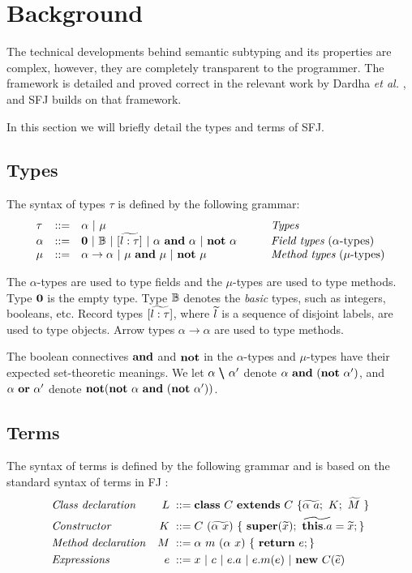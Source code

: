 \section{Background}
\label{sec:background}
The technical developments behind semantic subtyping and its properties are complex, however, they are completely transparent to the programmer. The framework is detailed and proved correct in the relevant work by Dardha \emph{et al.} \cite{Dardha2013,Dardha2017}, and SFJ builds on that framework.

In this section we will briefly detail the types and terms of SFJ.

\subsection{Types}
\label{sec:types}
The syntax of types $\tau$ is defined by the following grammar:
$$
\begin{array}{llll}
\tau & ::= & \alpha \ |\ \mu
& \mbox{{\em Types}}
\\
\alpha & ::=  & \zero \ |\ \btypes \ |\ [\wt{l:\tau}] \ |\ \alpha\ \synwedge\ \alpha \ |\ \synneg\ \alpha
\qquad
& \mbox{{\em Field types} ($\alpha $-types)}
\\
\mu & ::=  & \alpha \to \alpha \ |\ \mu\ \synwedge\ \mu \ |\ \synneg\ \mu
& \mbox{{\em Method types} ($\mu $-types)}
\end{array}
$$

The $\alpha$-types are used to type fields and the $\mu$-types are used to type methods.
Type $\mathbf{0}$ is the empty type.
Type ${\mathbb B}$ denotes the \emph{basic} types, such as integers, booleans, etc.
{Record} types $[\widetilde{l:\tau}]$, where $\widetilde{l}$ is a sequence of disjoint labels, are used to type objects.
Arrow types $\alpha \to \alpha$ are used to type methods.

The boolean connectives $\bf{and}$ and $\bf{not}$ in the $\alpha$-types and $\mu$-types have their expected set-theoretic meanings.
We let $\alpha\ \pmb{\backslash}\ \alpha'$  denote $\alpha\ \mathbf{and}\ (\mathbf{not}\ \alpha')$, and $\alpha\ \mathbf{or}\ \alpha'$  denote $\synneg(\synneg\ \alpha\ \synwedge\ (\synneg\ \alpha'))$.

\subsection{Terms}
\label{sec:terms}
The syntax of terms is defined by the following grammar and is based on the standard syntax of terms in FJ \cite{featherweight}:
\begin{align*}
     & \mbox{\textit{Class declaration}}  & L \; ::= \; & \syndecl{C}{C}{\wt{\alpha \ a};\ K; \ \wt{M}\ }                         \\
     & \mbox{\textit{Constructor}}        & K \;::=\;   & C\ (\wt{\alpha\ x})\ \{\ \synsuper(\wt{x});\ \wt{\synthis.a}=\wt{x}; \} \\
     & \mbox{\textit{Method declaration}} & M \; ::= \; & \alpha \ m\ (\alpha \ x)\ \{\ \synret e; \}                             \\
     & \mbox{\textit{Expressions}}        & e \; ::=\;  & x\ |\  c\ |\ e.a\ |\ e.m(e) \ | \ \synnew C(\wt{e})
\end{align*}

